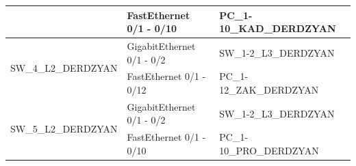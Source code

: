 \begin{table}[H]
\begin{tabularx}{\textwidth}{|X|X|X|}
		\cline{2-3}
			& FastEthernet 0/1 - 0/10 & PC\_1-10\_KAD\_DERDZYAN \\
		\hline
		\multirow{2}{*}{SW\_4\_L2\_DERDZYAN} & GigabitEthernet 0/1 - 0/2 & SW\_1-2\_L3\_DERDZYAN  \\
		\cline{2-3}
			& FastEthernet 0/1 - 0/12 & PC\_1-12\_ZAK\_DERDZYAN \\
		\hline
		\multirow{2}{*}{SW\_5\_L2\_DERDZYAN} & GigabitEthernet 0/1 - 0/2 & SW\_1-2\_L3\_DERDZYAN  \\
		\cline{2-3}
			& FastEthernet 0/1 - 0/10 & PC\_1-10\_PRO\_DERDZYAN \\
    \end{tabularx}
\end{table}

